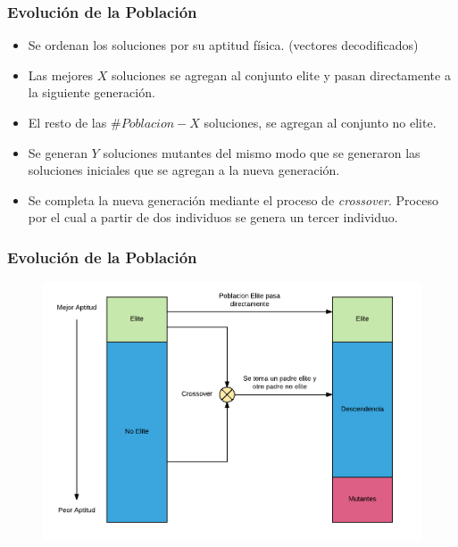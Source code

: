 \documentclass{beamer}
\begin{document}

\begin{frame}
\frametitle{Evolución de la Población}

\begin{itemize}
    \item Se ordenan los soluciones por su aptitud física. (vectores decodificados)
    \pause
    \item Las mejores $X$ soluciones se agregan al conjunto elite y pasan directamente a la siguiente generación.
    \pause
    \item El resto de las $\#Poblacion-X$ soluciones, se agregan al conjunto no elite.
    \pause
    \item Se generan $Y$ soluciones mutantes del mismo modo que se generaron las soluciones iniciales que se agregan a la nueva generación.
    \pause
    \item Se completa la nueva generación mediante el proceso de \textit{crossover}. Proceso por el cual a partir de dos individuos se genera un tercer individuo.
\end{itemize}

\end{frame}


\begin{frame}
\frametitle{Evolución de la Población}

\begin{figure}[h]
	\centering
	\includegraphics[width=12cm]{EvolucionPoblacion}
	\label{fig:EvolucionPoblacion}
\end{figure}

\end{frame}
\end{document}
